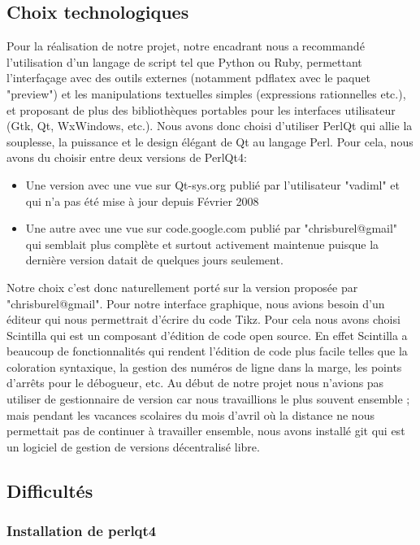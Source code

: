 \documentclass[a4paper]{report}
\begin{document}
  \subsection{Choix technologiques}
  Pour la réalisation de notre projet, notre encadrant nous a recommandé l'utilisation d'un langage de script tel que Python ou Ruby, permettant l'interfaçage avec des outils externes (notamment pdflatex avec le paquet "preview") et les manipulations textuelles simples (expressions rationnelles etc.), et proposant de plus des bibliothèques portables pour les interfaces utilisateur (Gtk, Qt, WxWindows, etc.). Nous avons donc choisi d'utiliser PerlQt qui allie la souplesse, la puissance et le design élégant de Qt au langage Perl. Pour cela, nous avons du choisir entre deux versions de PerlQt4:
\begin{itemize}
 \item Une version avec une vue sur Qt-sys.org publié par l'utilisateur "vadiml" et qui n'a pas été mise à jour depuis Février 2008
 \item Une autre avec une vue sur code.google.com publié par "chrisburel@gmail" qui semblait plus complète et surtout activement maintenue puisque la dernière version datait de quelques jours seulement.
\end{itemize}
  Notre choix c'est donc naturellement porté sur la version proposée par "chrisburel@gmail".
  \newline 
  Pour notre interface graphique, nous avions besoin d'un éditeur qui nous permettrait d'écrire du code Tikz. Pour cela nous avons choisi Scintilla qui est un composant d'édition de code open source. En effet Scintilla a beaucoup de fonctionnalités qui rendent l'édition de code plus facile telles que la coloration syntaxique, la gestion des numéros de ligne dans la marge, les points d'arrêts pour le débogueur, etc.
  \newline
  Au début de notre projet nous n'avions pas utiliser de gestionnaire de version car nous travaillions le plus souvent ensemble ; mais pendant les vacances scolaires du mois d'avril où la distance ne nous permettait pas de continuer à travailler ensemble, nous avons installé git qui est un logiciel de gestion de versions décentralisé libre. 
\subsection{Difficultés} 
\subsubsection{Installation de perlqt4}
\end{document}
